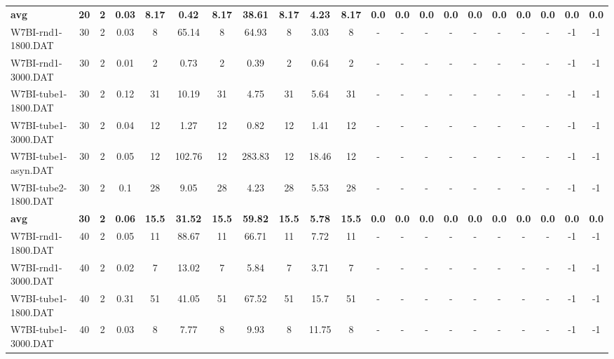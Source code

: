 \begin{sidewaystable}[!ht]
{\begin{tabular}{lcccccccccccccccccccc}
\cline{1-21} \textbf{avg} & \textbf{20} & \textbf{2} & \textbf{0.03} & \textbf{8.17} & \textbf{0.42} & \textbf{8.17} & \textbf{38.61} & \textbf{8.17} & \textbf{4.23} & \textbf{8.17} & \textbf{0.0} & \textbf{0.0} & \textbf{0.0} & \textbf{0.0} & \textbf{0.0} & \textbf{0.0} & \textbf{0.0} & \textbf{0.0} & \textbf{0.0} & \textbf{0.0} \\ \cline{1-21}
W7BI-rnd1-1800.DAT & 30 & 2 &  \textcolor{blue2}{0.03} & 8 & 65.14 & 8 & 64.93 & 8 & 3.03 & 8 &  - &  - &  - &  - &  - &  - &  - &  - & -1 & -1 \\
W7BI-rnd1-3000.DAT & 30 & 2 &  \textcolor{blue2}{0.01} & 2 & 0.73 & 2 & 0.39 & 2 & 0.64 & 2 &  - &  - &  - &  - &  - &  - &  - &  - & -1 & -1 \\
W7BI-tube1-1800.DAT & 30 & 2 &  \textcolor{blue2}{0.12} & 31 & 10.19 & 31 & 4.75 & 31 & 5.64 & 31 &  - &  - &  - &  - &  - &  - &  - &  - & -1 & -1 \\
W7BI-tube1-3000.DAT & 30 & 2 &  \textcolor{blue2}{0.04} & 12 & 1.27 & 12 & 0.82 & 12 & 1.41 & 12 &  - &  - &  - &  - &  - &  - &  - &  - & -1 & -1 \\
W7BI-tube1-asyn.DAT & 30 & 2 &  \textcolor{blue2}{0.05} & 12 & 102.76 & 12 & 283.83 & 12 & 18.46 & 12 &  - &  - &  - &  - &  - &  - &  - &  - & -1 & -1 \\
W7BI-tube2-1800.DAT & 30 & 2 &  \textcolor{blue2}{0.1} & 28 & 9.05 & 28 & 4.23 & 28 & 5.53 & 28 &  - &  - &  - &  - &  - &  - &  - &  - & -1 & -1 \\
\cline{1-21} \textbf{avg} & \textbf{30} & \textbf{2} & \textbf{0.06} & \textbf{15.5} & \textbf{31.52} & \textbf{15.5} & \textbf{59.82} & \textbf{15.5} & \textbf{5.78} & \textbf{15.5} & \textbf{0.0} & \textbf{0.0} & \textbf{0.0} & \textbf{0.0} & \textbf{0.0} & \textbf{0.0} & \textbf{0.0} & \textbf{0.0} & \textbf{0.0} & \textbf{0.0} \\ \cline{1-21}
W7BI-rnd1-1800.DAT & 40 & 2 &  \textcolor{blue2}{0.05} & 11 & 88.67 & 11 & 66.71 & 11 & 7.72 & 11 &  - &  - &  - &  - &  - &  - &  - &  - & -1 & -1 \\
W7BI-rnd1-3000.DAT & 40 & 2 &  \textcolor{blue2}{0.02} & 7 & 13.02 & 7 & 5.84 & 7 & 3.71 & 7 &  - &  - &  - &  - &  - &  - &  - &  - & -1 & -1 \\
W7BI-tube1-1800.DAT & 40 & 2 &  \textcolor{blue2}{0.31} & 51 & 41.05 & 51 & 67.52 & 51 & 15.7 & 51 &  - &  - &  - &  - &  - &  - &  - &  - & -1 & -1 \\
W7BI-tube1-3000.DAT & 40 & 2 &  \textcolor{blue2}{0.03} & 8 & 7.77 & 8 & 9.93 & 8 & 11.75 & 8 &  - &  - &  - &  - &  - &  - &  - &  - & -1 & -1 \\

\end{tabular}}
\end{sidewaystable}
